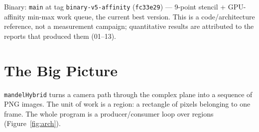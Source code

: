 \documentclass[
	english,
	letterpaper, oneside
]{article}
\begin{document}
\templatePagecfg
\templateFinalcfg

\inserttitle

\begin{center}\small\textsf{%
Binary: \texttt{main} at tag \texttt{binary-v5-affinity} (\texttt{fc33e29}) ---
9-point stencil + GPU-affinity min-max work queue, the current best version.
This is a code/architecture reference, not a measurement campaign; quantitative
results are attributed to the reports that produced them (01--13).%
}\end{center}

\begin{abstract}
This report is an end-to-end guide to the \texttt{mandelHybrid} source: what each
file does, how the pieces fit, and why the design balances load the way it does.
The program renders a 100-frame Mandelbrot zoom by recursively splitting each
frame into rectangular regions and computing them on a pool of CPU threads plus a
single GPU thread, all pulling from one shared work queue. The load-balancing
strategy is adaptive subdivision: a region whose sampled iteration counts
are uniform (or which is already small) is computed directly; otherwise it splits
into four and the children go back on the queue. The queue is executor-aware
--- the GPU thread takes the largest pending region, CPU threads the smallest ---
which routes the big coherent interior regions onto the processor that is
$\sim$30$\times$ faster on them. We walk every translation unit
(\texttt{main.cpp}, \texttt{mandelframe}, \texttt{mandelregion},
\texttt{workqueue}, \texttt{kernel.cu}) with real code excerpts, explain the Qt
and CUDA idioms a C++ reader may not know, and close with how the design's
measured behaviour (\,$\sim$49.9~s wall, GPU $\sim$91\,\% utilised, a conserved
$\sim$595~s of compute) follows from the code. Companion file:
\texttt{INSTRUMENTATION.md}.
\end{abstract}

\section{The Big Picture}

\texttt{mandelHybrid} turns a camera path through the complex plane into a
sequence of PNG images. The unit of work is a region: a rectangle of
pixels belonging to one frame. The whole program is a producer/consumer loop over
regions (Figure~\ref{fig:arch}).
\end{document}

